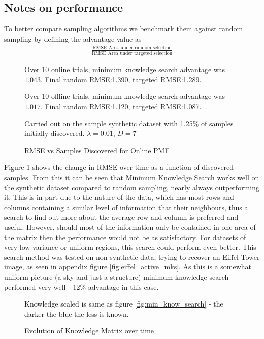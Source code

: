 \subsection{Notes on performance}

To better compare sampling algorithms we benchmark them against random sampling by defining the advantage value as 
\begin{align*}
\frac{\text{RMSE Area under random selection}}{\text{RMSE Area under targeted selection}}
\end{align*}


\begin{figure}[!htbp]
  \begin{center}
    \resizebox{\textwidth}{!}{}
  \end{center}
  Over 10 online trials, minimum knowledge search advantage was $1.043$. Final random RMSE:1.390, targeted RMSE:1.289.
  
   Over 10 offline trials, minimum knowledge search advantage was $1.017$. Final random RMSE:1.120, targeted RMSE:1.087. 
    
Carried out on the sample synthetic dataset with 1.25\% of samples initially discovered.  $\lambda = 0.01$, $D=7$
    \caption{RMSE vs Samples Discovered for Online PMF}
    \label{fig:online_pmf_active}
\end{figure}


Figure \ref{fig:online_pmf_active} shows the change in RMSE over time as a function of discovered samples. From this it can be seen that Minimum Knowledge Search works well on the synthetic dataset compared to random sampling, nearly always outperforming it. This is in part due to the nature of the data, which has most rows and columns containing a similar level of information that their neighbours, thus a search to find out more about the average row and column is preferred and useful. However, should most of the information only be contained in one area of the matrix then the performance would not be as satisfactory. For datasets of very low variance or uniform regions, this search could perform even better. This search method was tested on non-synthetic data, trying to recover an Eiffel Tower image, as seen in appendix figure \ref{fig:eiffel_active_mks}. As this is a somewhat uniform picture (a sky and just a structure) minimum knowledge search performed very well - 12\% advantage in this case.
\begin{figure}%
    \centering
    \qquad
    \qquad
    
    Knowledge scaled is same as figure \ref{fig:min_know_search} - the darker the blue the less is known.
    \caption{Evolution of Knowledge Matrix over time}%
    \label{fig:know_mat_it}
\end{figure}

